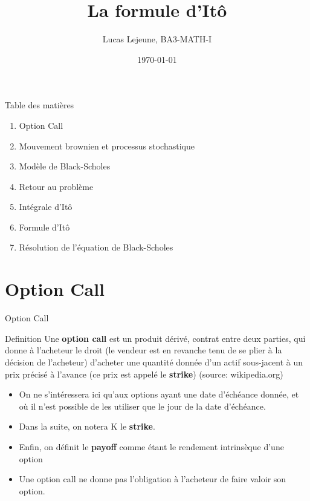\documentclass{beamer}
\title{La formule d'Itô}
\date{\today}
\author{Lucas Lejeune, BA3-MATH-I}
\newcommand{\1}{\mathmybb{1}}
\begin{document}
\frame{\titlepage}

\begin{frame}{Table des matières}
  \begin{enumerate}
    \item Option Call
    \item Mouvement brownien et processus stochastique
    \item Modèle de Black-Scholes
    \item Retour au problème
    \item Intégrale d'Itô
    \item Formule d'Itô
    \item Résolution de l'équation de Black-Scholes
  \end{enumerate}
\end{frame}
\section{Option Call}
\begin{frame}{Option Call}
  \begin{block}{Definition}
    Une \textbf{option call} est un produit dérivé, contrat entre deux parties, qui donne à l'acheteur le droit (le vendeur est en revanche tenu de se plier à la décision de l'acheteur) d'acheter une quantité donnée d'un actif sous-jacent à un prix précisé à l'avance (ce prix est appelé le \textbf{strike}) (source: wikipedia.org)
  \end{block}
  \pause
  \begin{itemize}
  \item On ne s'intéressera ici qu'aux options ayant une date d'échéance donnée, et où il n'est possible de les utiliser que le jour de la date d'échéance.
  \item Dans la suite, on notera K le \textbf{strike}.
  \item Enfin, on définit le \textbf{payoff} comme étant le rendement intrinsèque d'une option
    \item Une option call ne donne pas l'obligation à l'acheteur de faire valoir son option.
  \end{itemize}
\end{frame}
\end{document}
